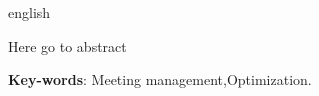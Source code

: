 \begin{resumo}[Abstract]
 \begin{otherlanguage*}{english}

   Here go to abstract

   \vspace{\onelineskip}

   \noindent
   \textbf{Key-words}: Meeting management,Optimization.
 \end{otherlanguage*}
\end{resumo}
